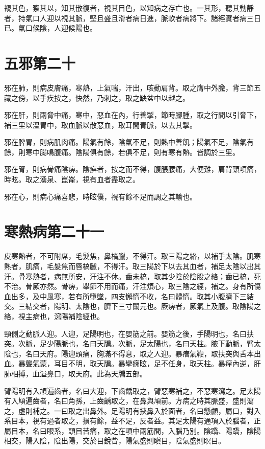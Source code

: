 覩其色，察其以，知其散復者，視其目色，以知病之存亡也。一其形，聽其動靜者，持氣口人迎以視其脈，堅且盛且滑者病日進，脈軟者病將下。諸經實者病三日已。氣口候陰，人迎候陽也。



\section{五邪第二十}

邪在肺，則病皮膚痛，寒熱，上氣喘，汗出，咳動肩背。取之膺中外腧，背三節五藏之傍，以手疾按之，快然，乃刺之，取之缺盆中以越之。

邪在肝，則兩脅中痛，寒中，惡血在內，行善掣，節時腳腫，取之行間以引脅下，補三里以溫胃中，取血脈以散惡血，取耳間青脈，以去其掣。

邪在脾胃，則病肌肉痛。陽氣有餘，陰氣不足，則熱中善飢；陽氣不足，陰氣有餘，則寒中腸鳴腹痛。陰陽俱有餘，若俱不足，則有寒有熱。皆調於三里。

邪在腎，則病骨痛陰痹。陰痹者，按之而不得，腹脹腰痛，大便難，肩背頸項痛，時眩。取之湧泉、崑崙，視有血者盡取之。

邪在心，則病心痛喜悲，時眩僕，視有餘不足而調之其輸也。


\section{寒熱病第二十一}

皮寒熱者，不可附席，毛髮焦，鼻槁臘，不得汗。取三陽之絡，以補手太陰。肌寒熱者，肌痛，毛髮焦而唇槁臘，不得汗。取三陽於下以去其血者，補足太陰以出其汗。骨寒熱者，病無所安，汗注不休。齒未槁，取其少陰於陰股之絡；齒已槁，死不治。骨厥亦然。骨痹，舉節不用而痛，汗注煩心，取三陰之經，補之。身有所傷血出多，及中風寒，若有所墮墜，四支懈惰不收，名曰體惰。取其小腹臍下三結交。三結交者，陽明、太陰也，臍下三寸關元也。厥痹者，厥氣上及腹。取陰陽之絡，視主病也，瀉陽補陰經也。

頸側之動脈人迎。人迎，足陽明也，在嬰筋之前。嬰筋之後，手陽明也，名曰扶突。次脈，足少陽脈也，名曰天牖。次脈，足太陽也，名曰天柱。腋下動脈，臂太陰也，名曰天府。陽迎頭痛，胸滿不得息，取之人迎。暴瘖氣鞭，取扶突與舌本出血。暴聾氣蒙，耳目不明，取天牖。暴攣癇眩，足不任身，取天柱。暴癉內逆，肝肺相搏，血溢鼻口，取天府。此為天牖五部。

臂陽明有入頄遍齒者，名曰大迎，下齒齲取之，臂惡寒補之，不惡寒瀉之。足太陽有入頄遍齒者，名曰角孫，上齒齲取之，在鼻與頄前。方病之時其脈盛，盛則瀉之，虛則補之。一曰取之出鼻外。足陽明有挾鼻入於面者，名曰懸顱，屬口，對入系目本，視有過者取之，損有餘，益不足，反者益。其足太陽有通項入於腦者，正屬目本，名曰眼系，頭目苦痛，取之在項中兩筋間，入腦乃別。陰蹻、陽蹻，陰陽相交，陽入陰，陰出陽，交於目銳眥，陽氣盛則瞋目，陰氣盛則瞑目。

